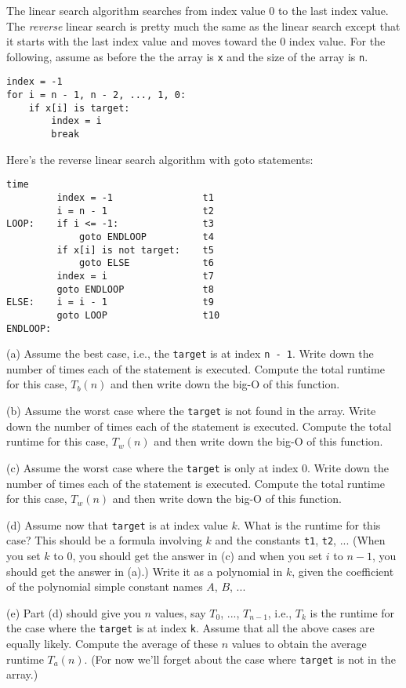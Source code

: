 The linear search algorithm searches from index value 0 to the
last index value.
The \textit{reverse} linear search is pretty much the same as the linear
search except that it starts with the last index value and moves
toward the 0 index value.
For the following, assume as before the the array is \verb!x!
and the size of the array is \verb!n!. 
\begin{Verbatim}[frame=single, fontsize=\footnotesize]
index = -1
for i = n - 1, n - 2, ..., 1, 0:
    if x[i] is target:
        index = i
        break
\end{Verbatim}
Here's the reverse linear search algorithm with goto statements:
\begin{Verbatim}[frame=single, fontsize=\footnotesize]
                                   time      
         index = -1                t1     
         i = n - 1                 t2     
LOOP:    if i <= -1:               t3      
             goto ENDLOOP          t4     
         if x[i] is not target:    t5        
             goto ELSE             t6      
         index = i                 t7     
         goto ENDLOOP              t8     
ELSE:    i = i - 1                 t9     
         goto LOOP                 t10    
ENDLOOP:
\end{Verbatim}

(a) Assume the best case, i.e., the \verb!target! is at index 
\verb!n - 1!.
Write down the number of times each of the statement is executed.
Compute the total runtime for this case, $T_b(n)$ and then
write down the big-O of this function.

(b) Assume the worst case where the \verb!target! is not found in the 
array.
Write down the number of times each of the statement is executed.
Compute the total runtime for this case, $T_w(n)$ and then
write down the big-O of this function.

(c) Assume the worst case where the \verb!target! is only at index 0.
Write down the number of times each of the statement is executed.
Compute the total runtime for this case, $T_w(n)$ and then
write down the big-O of this function.

(d) Assume now that \verb!target! is at index value $k$.
What is the runtime for this case? 
This should be a formula involving $k$ and the constants 
\verb!t1!, \verb!t2!, ...
(When you set $k$ to $0$, you should get the answer in (c)
and when you set $i$ to $n - 1$, you should get the answer in (a).)
Write it as a polynomial in $k$, given the coefficient of the polynomial
simple constant names $A$, $B$, ...

(e) Part (d) should give you $n$ values, say $T_0$, ..., $T_{n-1}$,
i.e., $T_k$ is the runtime for the case where the \verb!target! is at index 
\verb!k!.
Assume that all the above cases are equally likely.
Compute the average of these $n$ values to obtain
the average runtime $T_a(n)$.
(For now we'll forget about the case where \verb!target! is not in the array.)
